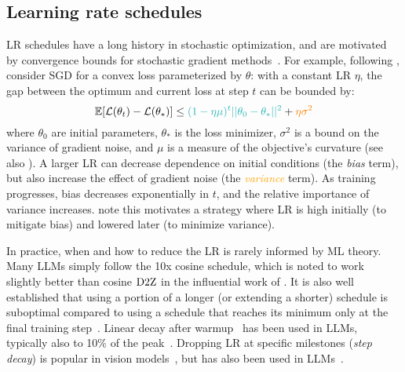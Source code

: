 \subsection{Learning rate schedules}\label{subsec:lr_schedules}

LR schedules have a long history in stochastic optimization, and are
motivated by convergence bounds for stochastic gradient
methods~\citep{moulines2011non,bottou2018optimization}.  For example,
following \citet{andriushchenko2023why}, consider SGD for a convex
loss parameterized by $\theta$: with a constant LR $\eta$, the gap
between the optimum and current loss at step $t$ can be bounded by:
\begin{equation}\label{eqn:biasvar}
\E[\Ls(\theta_t) - \Ls(\theta_*)] \le
\textcolor{TealBlue}{(1 - \eta\mu)^t ||\theta_0 - \theta_*||^2 }
+ \textcolor{orange}{\eta \sigma^2}
\end{equation}
where $\theta_0$ are initial parameters, $\theta_*$ is the loss
minimizer, $\sigma^2$ is a bound on the variance of gradient noise,
and $\mu$ is a measure of the objective's curvature (see also
\citet[Theorem~4.6]{bottou2018optimization}).  A larger LR can
decrease dependence on initial conditions (the
\textcolor{TealBlue}{\emph{bias}} term), but also increase the effect
of gradient noise (the \textcolor{orange}{\emph{variance}} term).
%
As training progresses, bias decreases exponentially in $t$, and the
relative importance of variance increases.
\citet{bottou2018optimization} note this motivates a strategy where LR
is high initially (to mitigate bias) and lowered later (to minimize
variance).

In practice, when and how to reduce the LR is rarely informed by ML
theory.
%
Many LLMs simply follow the 10x cosine schedule, which is noted to
work slightly better than cosine $\mbox{D2Z}$ in the influential work of
\citet{hoffmann2022empirical}.
%
It is also well established that using a portion of a longer (or
extending a shorter) schedule is suboptimal compared to using a
schedule that reaches its minimum only at the final training
step~\citep{li2019budgeted,hoffmann2022empirical,hu2024minicpm,hagele2024scaling}.
%
%
Linear decay after warmup~\citep{howard2018universal} has been used in
LLMs, typically also to 10\% of the
peak~\citep{henighan2020scaling,dey2023cerebras,sengupta2023jais}.
%
Dropping LR at specific milestones (\emph{step decay}) is popular in
vision models~\citep{he2016deep,zagoruyko2016wide,li2020reconciling},
but has also been used in LLMs~\citep{bi2024deepseek}.

